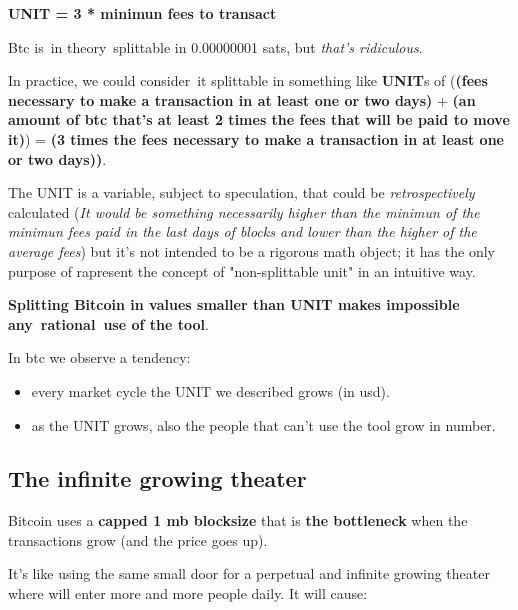 \documentclass{article}
\begin{document}
\textbf{UNIT = 3 * minimun fees to transact}\vspace{0.6cm}




Btc is in theory splittable in 0.00000001 sats, but \emph{that's ridiculous}.

In practice, we could consider it splittable in something like \textbf{UNIT}s of (\textbf{(fees necessary to make a transaction in at least one or two days)} + \textbf{(an amount of btc that's at least 2 times the fees that will be paid to move it)}) = \textbf{(3 times the fees necessary to make a transaction in at least one or two days))}.\vspace{0.2cm}

The UNIT is a variable, subject to speculation, that could be \emph{retrospectively} calculated (\emph{It would be something necessarily higher than the minimun of the minimun fees paid in the last days of blocks and lower than the higher of the average fees}) but it's not intended to be a rigorous math object; it has the only purpose of rapresent the concept of "non-splittable unit" in an intuitive way.\vspace{0.3cm}


\textbf{Splitting Bitcoin in values smaller than UNIT makes impossible any rational use of the tool}.\vspace{0.4cm}


In btc we observe a tendency:


\begin{itemize}

	\item every market cycle the UNIT we described grows (in usd).
	\item as the UNIT grows, also the people that can't use the tool grow in number.\vspace{0.3cm}

\end{itemize}


\subsection{The infinite growing theater}


Bitcoin uses a \textbf{capped 1 mb blocksize} that is \textbf{the bottleneck} when the transactions grow (and the price goes up).\vspace{0.2cm}

It's like using the same small door for a perpetual and infinite growing theater where will enter more and more people daily. It will cause:
\end{document}
